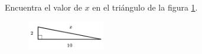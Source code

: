 \question[15]  Encuentra el valor de $x$ en el triángulo de la figura \ref{fig:lados_pitagoras_09}.
\begin{figure}[H]
    \begin{center}
        \includegraphics[width=0.3\textwidth]{../images/lados_pitagoras_09.png}
    \end{center}
    \caption{}
    \label{fig:lados_pitagoras_09}
\end{figure}